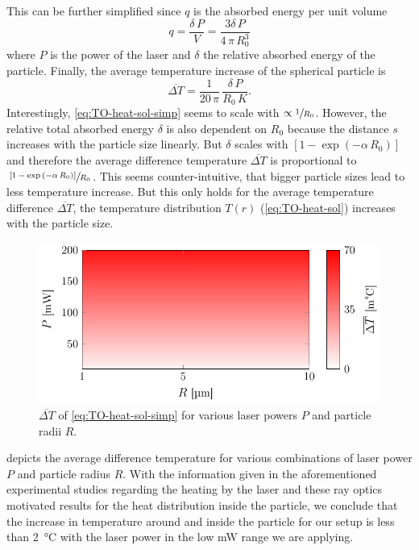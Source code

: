 This can be further simplified since $q$ is the absorbed energy per unit volume
\begin{equation}
  q = \frac{\delta\,P}{V} = \frac{3\delta\,P}{4\,\pi\,R_{0}^{3}}
\end{equation}
where $P$ is the power of the laser and $\delta$ the relative absorbed energy 
of the particle. Finally, the average temperature increase of the spherical 
particle is
\begin{equation}
  \overline{\Delta T} = \frac{1}{20\,\pi}\,\frac{\delta\,P}{R_{0}\,K}.
  \label{eq:TO-heat-sol-simp}
\end{equation}
Interestingly, \cref{eq:TO-heat-sol-simp} seems to scale with $\propto 
\sfrac{1}{R_{0}}$. However, the relative total absorbed energy $\delta$ is also 
dependent on $R_{0}$ because the distance $s$ increases with the particle size 
linearly. But $\delta$ scales with $\left[  1-\exp\left( -\alpha\,R_{0} 
\right)\right]$ and therefore the average difference temperature 
$\overline{\Delta T}$ is proportional to $\sfrac{\left[ 1-\exp\left( 
-\alpha\,R_{0} \right) \right]}{R_{0}}$. This seems counter-intuitive, that 
bigger particle sizes lead to less temperature increase. But this only holds 
for the average temperature difference $\overline{\Delta T}$, the temperature 
distribution $T(r)$ (\cref{eq:TO-heat-sol}) increases with the particle size.

\begin{figure}[tbp]
  \centering
  \includegraphics[]{Plots/cache/dT.pdf}
  \caption{$\overline{\Delta T}$ of \cref{eq:TO-heat-sol-simp} for various 
  laser powers $P$ and particle radii $R$.}
  \label{fig:TO-dT}
\end{figure}

 depicts the average difference temperature for various 
combinations of laser power $P$ and particle radius $R$. With the information 
given in the aforementioned experimental studies regarding the heating by the 
laser and these ray optics motivated results for the heat distribution inside 
the particle, we conclude that the increase in temperature around and inside 
the particle for our setup is less than \SI{2}{\degreeCelsius} with the laser 
power in the low \si{\milli\watt} range we are applying.

